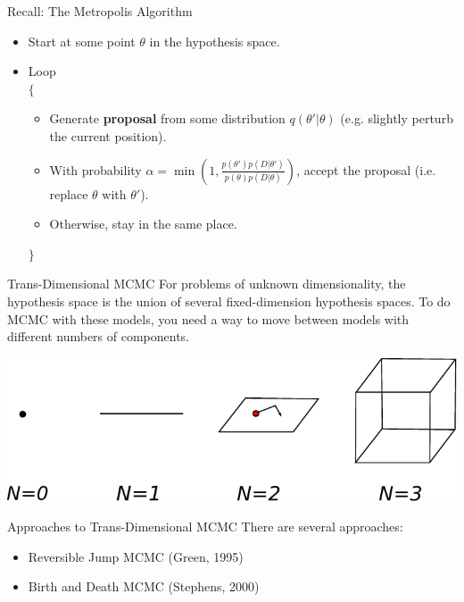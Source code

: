 \begin{frame}[t]{Recall: The Metropolis Algorithm}

\begin{itemize}
\item Start at some point $\theta$ in the hypothesis space.
\item Loop\\
$\{$
  \begin{itemize}
  \item Generate {\bf proposal} from some distribution $q(\theta' | \theta)$
  (e.g. slightly perturb the current position).
  \item With probability $\alpha = \min\left(1, \frac{p(\theta')p(D|\theta')}{p(\theta)p(D|\theta)}\right)$, accept the proposal (i.e. replace $\theta$ with $\theta'$).
  \item Otherwise, stay in the same place.
  \end{itemize}
$\}$
\end{itemize}
\end{frame}


\begin{frame}[t]{Trans-Dimensional MCMC}
For problems of unknown dimensionality, the hypothesis space is the union
of several fixed-dimension hypothesis spaces. To do MCMC with these models,
you need a way to move between models with different numbers of components.

\begin{center}
\includegraphics[scale=0.7]{drawing.pdf}
\end{center}

\end{frame}


\begin{frame}[t]{Approaches to Trans-Dimensional MCMC}
There are several approaches:

\begin{itemize}
\item Reversible Jump MCMC (Green, 1995)\\
\item Birth and Death MCMC (Stephens, 2000)
\end{itemize}

\end{frame}


